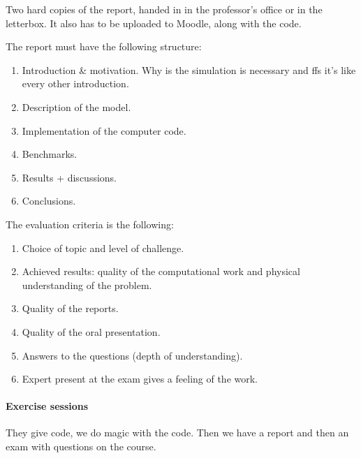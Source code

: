 \documentclass[palatino]{epflnotes}
\begin{document}
Two hard copies of the report, handed in in the professor's office or in the letterbox. It also has to be uploaded to Moodle, along with the code.

The report must have the following structure:

\begin{enumerate}
\item Introduction \& motivation. Why is the simulation is necessary and ffs it's like every other introduction.
\item Description of the model.
\item Implementation of the computer code.
\item Benchmarks.
\item Results + discussions.
\item Conclusions.
\end{enumerate}

The evaluation criteria is the following:

\begin{enumerate}
\item Choice of topic and level of challenge.
\item Achieved results: quality of the computational work and physical understanding of the problem.
\item Quality of the reports.
\item Quality of the oral presentation.
\item Answers to the questions (depth of understanding).
\item Expert present at the exam gives a feeling of the work.
\end{enumerate}

\paragraph{Exercise sessions} They give code, we do magic with the code. Then we have a report and then an exam with questions on the course.

%

\backmatter
\printindex
\end{document}
